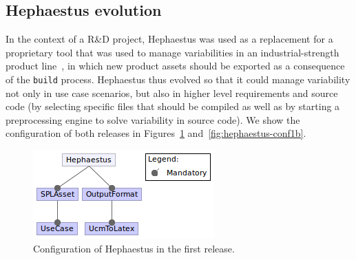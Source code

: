 \subsection{Hephaestus evolution} \label{hp-evolution}



In the context of a R\&D project, Hephaestus was used as a replacement for a proprietary tool that was used to
manage variabilities in an industrial-strength product line~\cite{ferreira:2010},
in which new product assets should be exported as a consequence of the
\texttt{build} process. Hephaestus thus evolved so that it could manage variability not only in use case
scenarios, but also in higher level requirements and source code (by selecting specific files that should be compiled as well as by
starting a preprocessing engine to solve variability in source
code). We show the configuration of both releases in 
Figures~\ref{fig:hephaestus-conf1a} and~\ref{fig:hephaestus-conf1b}.



\begin{figure}[bth]
\begin{center}
\includegraphics[scale=0.6]{imagens/conf1a-hp.png}
\caption{Configuration of Hephaestus in the first release.}
\label{fig:hephaestus-conf1a}
\end{center}
\end{figure}


